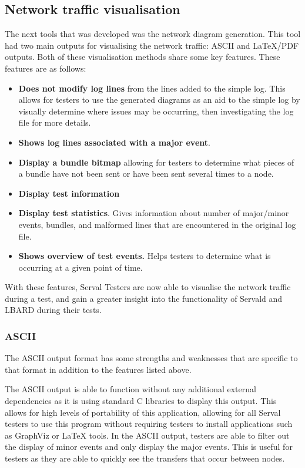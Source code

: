 \subsection{Network traffic visualisation}
The next tools that was developed was the network diagram generation.
This tool had two main outputs for visualising the network traffic: ASCII and LaTeX/PDF outputs.
Both of these visualisation methods share some key features.
These features are as follows:
\begin{itemize}
    \item \textbf{Does not modify log lines} from the lines added to the simple log. 
    This allows for testers to use the generated diagrams as an aid to the simple log by visually determine where issues may be occurring, then investigating the log file for more details. 
    \item \textbf{Shows log lines associated with a major event}. 
    \item \textbf{Display a bundle bitmap} allowing for testers to determine what pieces of a bundle have not been sent or have been sent several times to a node.
    \item \textbf{Display test information}
    \item \textbf{Display test statistics}. 
    Gives information about number of major/minor events, bundles, and malformed lines that are encountered in the original log file.
    \item \textbf{Shows overview of test events.}  
    Helps testers to determine what is occurring at a given point of time.
\end{itemize}
With these features, Serval Testers are now able to visualise the network traffic during a test, and gain a greater insight into the functionality of Servald and LBARD during their tests.


\subsubsection{ASCII}
The ASCII output format has some strengths and weaknesses that are specific to that format in addition to the features listed above.


The ASCII output is able to function without any additional external dependencies as it is using standard C libraries to display this output.
This allows for high levels of portability of this application, allowing for all Serval testers to use this program without requiring testers to install applications such as GraphViz or LaTeX tools.
In the ASCII output, testers are able to filter out the display of minor events and only display the major events.
This is useful for testers as they are able to quickly see the transfers that occur between nodes.

